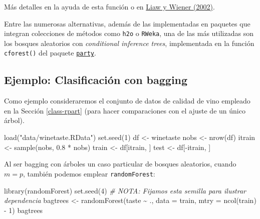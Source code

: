 \documentclass[
  spanish,
]{book}
\newenvironment{Shaded}{\begin{snugshade}}{\end{snugshade}}
\newcommand{\AttributeTok}[1]{\textcolor[rgb]{0.77,0.63,0.00}{#1}}
\newcommand{\CommentTok}[1]{\textcolor[rgb]{0.56,0.35,0.01}{\textit{#1}}}
\newcommand{\DecValTok}[1]{\textcolor[rgb]{0.00,0.00,0.81}{#1}}
\newcommand{\FloatTok}[1]{\textcolor[rgb]{0.00,0.00,0.81}{#1}}
\newcommand{\FunctionTok}[1]{\textcolor[rgb]{0.00,0.00,0.00}{#1}}
\newcommand{\NormalTok}[1]{#1}
\newcommand{\OtherTok}[1]{\textcolor[rgb]{0.56,0.35,0.01}{#1}}
\newcommand{\SpecialCharTok}[1]{\textcolor[rgb]{0.00,0.00,0.00}{#1}}
\newcommand{\StringTok}[1]{\textcolor[rgb]{0.31,0.60,0.02}{#1}}
\theoremstyle{break}
\theoremstyle{definition}
\theoremstyle{definition}
\theoremstyle{definition}
\theoremstyle{definition}
\theoremstyle{remark}
\begin{document}
Más detalles en la ayuda de esta función o en \href{https://www.r-project.org/doc/Rnews/Rnews_2002-3.pdf}{Liaw y Wiener (2002)}.

Entre las numerosas alternativas, además de las implementadas en paquetes que integran colecciones de métodos como \texttt{h2o} o \texttt{RWeka}, una de las más utilizadas son los bosques aleatorios con \emph{conditional inference trees}, implementada en la función \texttt{cforest()} del paquete \href{https://CRAN.R-project.org/package=party}{\texttt{party}}.

\hypertarget{ejemplo-clasificaciuxf3n-con-bagging}{%
\subsection{Ejemplo: Clasificación con bagging}\label{ejemplo-clasificaciuxf3n-con-bagging}}

Como ejemplo consideraremos el conjunto de datos de calidad de vino empleado en la Sección \ref{class-rpart} (para hacer comparaciones con el ajuste de un único árbol).

\begin{Shaded}
\begin{Highlighting}[]
\FunctionTok{load}\NormalTok{(}\StringTok{"data/winetaste.RData"}\NormalTok{)}
\FunctionTok{set.seed}\NormalTok{(}\DecValTok{1}\NormalTok{)}
\NormalTok{df }\OtherTok{\textless{}{-}}\NormalTok{ winetaste}
\NormalTok{nobs }\OtherTok{\textless{}{-}} \FunctionTok{nrow}\NormalTok{(df)}
\NormalTok{itrain }\OtherTok{\textless{}{-}} \FunctionTok{sample}\NormalTok{(nobs, }\FloatTok{0.8} \SpecialCharTok{*}\NormalTok{ nobs)}
\NormalTok{train }\OtherTok{\textless{}{-}}\NormalTok{ df[itrain, ]}
\NormalTok{test }\OtherTok{\textless{}{-}}\NormalTok{ df[}\SpecialCharTok{{-}}\NormalTok{itrain, ]}
\end{Highlighting}
\end{Shaded}

Al ser bagging con árboles un caso particular de bosques aleatorios, cuando \(m = p\), también podemos emplear \texttt{randomForest}:

\begin{Shaded}
\begin{Highlighting}[]
\FunctionTok{library}\NormalTok{(randomForest)}
\FunctionTok{set.seed}\NormalTok{(}\DecValTok{4}\NormalTok{) }\CommentTok{\# NOTA: Fijamos esta semilla para ilustrar dependencia}
\NormalTok{bagtrees }\OtherTok{\textless{}{-}} \FunctionTok{randomForest}\NormalTok{(taste }\SpecialCharTok{\textasciitilde{}}\NormalTok{ ., }\AttributeTok{data =}\NormalTok{ train, }\AttributeTok{mtry =} \FunctionTok{ncol}\NormalTok{(train) }\SpecialCharTok{{-}} \DecValTok{1}\NormalTok{)}
\NormalTok{bagtrees}
\end{Highlighting}
\end{Shaded}
\end{document}
